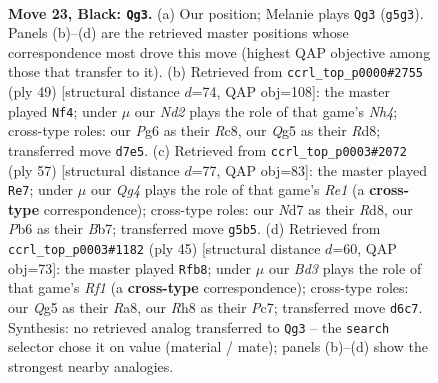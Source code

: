 \documentclass[11pt]{article}
\begin{document}
\clearpage

\begin{figure}[p]\centering
\begin{subfigure}{0.46\textwidth}\centering
\resizebox{\linewidth}{!}{%
\newchessgame
\chessboard[
  setfen={r6r/3nk2p/1ppbp1p1/6q1/1p1P4/P3P2P/1P3RN1/R1BQ2K1 b - - 1 23},
  showmover=false,
  pgfstyle=straightmove, color=movearrow, markmove={g5-g3}
]}
\caption{}
\end{subfigure}\hfill
\begin{subfigure}{0.46\textwidth}\centering
\resizebox{\linewidth}{!}{%
\newchessgame
\chessboard[
  setfen={2rr2k1/pp3bpp/8/3Pqp1n/P3P3/R3RP1P/2pQ1NP1/2B3K1 b - - 1 25},
  showmover=false,
  pgfstyle=straightmove, color=movearrow, markmove={h5-f4}
]}
\caption{}
\end{subfigure}
\\[4pt]
\begin{subfigure}{0.46\textwidth}\centering
\resizebox{\linewidth}{!}{%
\newchessgame
\chessboard[
  setfen={3rr1k1/1bp3pp/1p6/p1b1N2q/2P2P2/1P5P/PBQ1R1PK/5R2 b - - 1 29},
  showmover=false,
  pgfstyle=straightmove, color=movearrow, markmove={e8-e7}
]}
\caption{}
\end{subfigure}\hfill
\begin{subfigure}{0.46\textwidth}\centering
\resizebox{\linewidth}{!}{%
\newchessgame
\chessboard[
  setfen={r4rk1/2p2pp1/P1pb1n2/5q2/3P3p/2N3P1/1P3P1P/R1BR1QK1 b - - 0 23},
  showmover=false,
  pgfstyle=straightmove, color=movearrow, markmove={f8-b8}
]}
\caption{}
\end{subfigure}
\caption{\textbf{Move 23, Black: \texttt{Qg3}.} (a) Our position; Melanie plays \texttt{Qg3} (\texttt{g5g3}). Panels (b)--(d) are the retrieved master positions whose correspondence most drove this move (highest QAP objective among those that transfer to it). (b) Retrieved from \texttt{ccrl\_top\_p0000\#2755} (ply 49) [structural distance $d$=74, QAP obj=108]: the master played \texttt{Nf4}; under $\mu$ our \emph{Nd2} plays the role of that game's \emph{Nh4}; cross-type roles: our \emph{P}g6 as their \emph{R}c8, our \emph{Q}g5 as their \emph{R}d8; transferred move \texttt{d7e5}. (c) Retrieved from \texttt{ccrl\_top\_p0003\#2072} (ply 57) [structural distance $d$=77, QAP obj=83]: the master played \texttt{Re7}; under $\mu$ our \emph{Qg4} plays the role of that game's \emph{Re1} (a \textbf{cross-type} correspondence); cross-type roles: our \emph{N}d7 as their \emph{R}d8, our \emph{P}b6 as their \emph{B}b7; transferred move \texttt{g5b5}. (d) Retrieved from \texttt{ccrl\_top\_p0003\#1182} (ply 45) [structural distance $d$=60, QAP obj=73]: the master played \texttt{Rfb8}; under $\mu$ our \emph{Bd3} plays the role of that game's \emph{Rf1} (a \textbf{cross-type} correspondence); cross-type roles: our \emph{Q}g5 as their \emph{R}a8, our \emph{R}h8 as their \emph{P}c7; transferred move \texttt{d6c7}. Synthesis: no retrieved analog transferred to \texttt{Qg3} -- the \texttt{search} selector chose it on value (material / mate); panels (b)--(d) show the strongest nearby analogies.}
\label{fig:thought-m45}
\end{figure}
\end{document}
